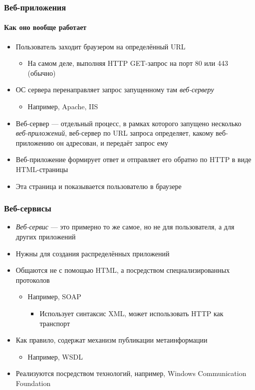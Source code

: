 \documentclass[xetex,mathserif,serif]{beamer}
\begin{document}
	\begin{frame}
		\frametitle{Веб-приложения}
		\framesubtitle{Как оно вообще работает}
		\begin{itemize}
			\item Пользователь заходит браузером на определённый URL
			\begin{itemize}
				\item На самом деле, выполняя HTTP GET-запрос на порт 80 или 443 (обычно)
			\end{itemize}
			\item ОС сервера перенаправляет запрос запущенному там \textit{веб-серверу}
			\begin{itemize}
				\item Например, Apache, IIS
			\end{itemize}
			\item Веб-сервер --- отдельный процесс, в рамках которого запущено несколько \textit{веб-приложений}, веб-сервер по URL запроса определяет, какому веб-приложению он адресован, и передаёт запрос ему
			\item Веб-приложение формирует ответ и отправляет его обратно по HTTP в виде HTML-страницы
			\item Эта страница и показывается пользователю в браузере
		\end{itemize}
	\end{frame}

	\begin{frame}
		\frametitle{Веб-сервисы}
		\begin{itemize}
			\item \textit{Веб-сервис} --- это примерно то же самое, но не для пользователя, а для других приложений
			\item Нужны для создания распределённых приложений
			\item Общаются не с помощью HTML, а посредством специализированных протоколов
			\begin{itemize}
				\item Например, SOAP 
				\begin{itemize}
					\item Использует синтаксис XML, может использовать HTTP как транспорт
				\end{itemize}
			\end{itemize}
			\item Как правило, содержат механизм публикации метаинформации
			\begin{itemize}
				\item Например, WSDL
			\end{itemize}
			\item Реализуются посредством технологий, например, Windows Communication Foundation
		\end{itemize}
	\end{frame}
\end{document}
